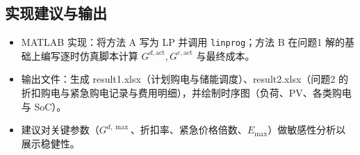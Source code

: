\documentclass[12pt]{article}
\begin{document}
\subsection{实现建议与输出}
\begin{itemize}
  \item MATLAB 实现：将方法 A 写为 LP 并调用 \texttt{linprog}；方法 B 在问题1 解的基础上编写逐时仿真脚本计算 $G^{d,\mathrm{act}},G^{e,\mathrm{act}}$ 与最终成本。
  \item 输出文件：生成 result1.xlsx（计划购电与储能调度）、result2.xlsx（问题2 的折扣购电与紧急购电记录与费用明细），并绘制时序图（负荷、PV、各类购电与 SoC）。
  \item 建议对关键参数（$G^{d,\max}$、折扣率、紧急价格倍数、$E_{\max}$）做敏感性分析以展示稳健性。
\end{itemize}
\end{document}
